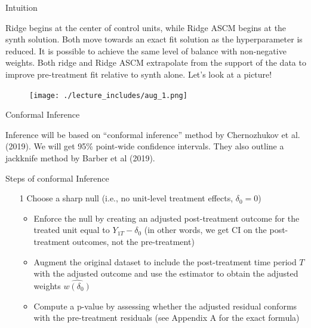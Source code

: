 \documentclass{beamer}
\begin{document}
\begin{frame}{Intuition}

Ridge begins at the center of control units, while Ridge ASCM begins at the synth solution. Both move towards an exact fit solution as the hyperparameter is reduced. It is possible to achieve the same level of balance with non-negative weights.  Both ridge and Ridge ASCM extrapolate from the support of the data to improve pre-treatment fit relative to synth alone. Let's look at a picture!


\end{frame}



\begin{frame}[plain]

	\begin{figure}
	\texttt{[image: ./lecture\_includes/aug\_1.png]}
	\end{figure}
	
\end{frame}	


\begin{frame}{Conformal Inference}

Inference will be based on ``conformal inference'' method by Chernozhukov et al. (2019).  We will get 95\% point-wide confidence intervals. They also outline a jackknife method by Barber et al (2019). 

\end{frame}


\begin{frame}{Steps of conformal Inference}

\begin{enumerate}
\item [1] Choose a sharp null (i.e., no unit-level treatment effects, $\delta_0=0$)
	\begin{itemize}
	\item Enforce the null by creating an adjusted post-treatment outcome for the treated unit equal to $Y_{1T}-\delta_0$ (in other words, we get CI on the post-treatment outcomes, not the pre-treatment)
	\item Augment the original dataset to include the post-treatment time period $T$ with the adjusted outcome and use the estimator to obtain the adjusted weights $\widehat{w(\delta_0)}$
	\item Compute a p-value by assessing whether the adjusted residual conforms with the pre-treatment residuals (see Appendix A for the exact formula)
	\end{itemize}
\end{enumerate}


\end{frame}
\end{document}
